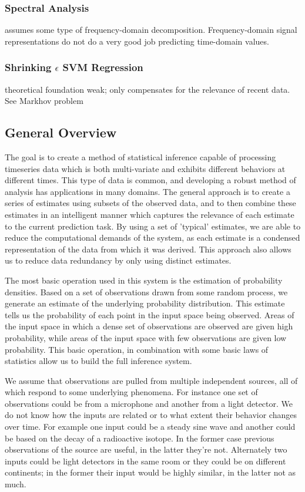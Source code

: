 \documentclass[10pt]{article}
\begin{document}
\subsubsection{Spectral Analysis}
assumes some type of frequency-domain decomposition.  Frequency-domain signal representations do not do a very good job predicting time-domain values. 

\subsubsection{Shrinking \(\epsilon\) SVM Regression}
theoretical foundation weak; only compensates for the relevance of recent data.  See Markhov problem


\subsection{General Overview}
The goal is to create a method of statistical inference capable of processing timeseries data which is both multi-variate and exhibits different behaviors at different times.  This type of data is common, and developing a robust method of analysis has applications in many domains.  The general approach is to create a series of estimates using subsets of the observed data, and to then combine these estimates in an intelligent manner which captures the relevance of each estimate to the current prediction task.  By using a set of 'typical' estimates, we are able to reduce the computational demands of the system, as each estimate is a condensed representation of the data from which it was derived.  This approach also allows us to reduce data redundancy by only using distinct estimates.

The most basic operation used in this system is the estimation of probability densities.  Based on a set of observations drawn from some random process, we generate an estimate of the underlying probability distribution.  This estimate tells us the probability of each point in the input space being observed.  Areas of the input space in which a dense set of observations are observed are given high probability, while areas of the input space with few observations are given low probability.  This basic operation, in combination with some basic laws of statistics allow us to build the full inference system.

We assume that observations are pulled from multiple independent sources, all of which respond to some underlying phenomena.  For instance one set of observations could be from a microphone and another from a light detector.  We do not know how the inputs are related or to what extent their behavior changes over time.  For example one input could be a steady sine wave and another could be based on the decay of a radioactive isotope.  In the former case previous observations of the source are useful, in the latter they're not.  Alternately two inputs could be light detectors in the same room or they could be on different continents; in the former their input would be highly similar, in the latter not as much.
\end{document}
